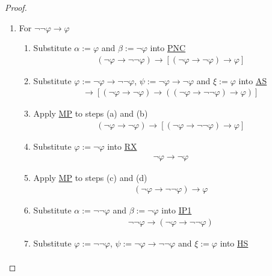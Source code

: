 \documentclass{treatise}
\begin{document}
\begin{proof} \ 
\begin{enumerate}
    \item For $\neg \neg \varphi \to \varphi$
    \begin{enumerate}
        \item Substitute $\alpha := \varphi$ and $\beta := \neg \varphi$ into \hyperref[HPL-A-PNC]{PNC}
        \begin{align*}
            (\neg \varphi \to \neg \neg \varphi) \to [(\neg \varphi \to \neg \varphi) \to \varphi]
        \end{align*}
        \item Substitute $\varphi := \neg \varphi \to \neg \neg \varphi$, $\psi := \neg \varphi \to \neg \varphi$ and $\xi := \varphi$ into \hyperref[HPL-T-AS]{AS}
        \begin{align*}
            [(\neg \varphi \to \neg \neg \varphi) \to ((\neg \varphi \to \neg \varphi) \to \varphi)] \to [(\neg \varphi \to \neg \varphi) \to ((\neg \varphi \to \neg \neg \varphi) \to \varphi)]
        \end{align*}
        \item Apply \hyperref[HPL-R-MP]{MP} to steps (a) and (b)
        \begin{align*}
            (\neg \varphi \to \neg \varphi) \to [(\neg \varphi \to \neg \neg \varphi) \to \varphi]
        \end{align*}
        \item Substitute $\varphi := \neg \varphi$ into \hyperref[HPL-T-RX]{RX}
        \begin{align*}
            \neg \varphi \to \neg \varphi
        \end{align*}
        \item Apply \hyperref[HPL-R-MP]{MP} to steps (c) and (d)
        \begin{align*}
            (\neg \varphi \to \neg \neg \varphi) \to \varphi
        \end{align*}
        \item Substitute $\alpha := \neg \neg \varphi$ and $\beta := \neg \varphi$ into \hyperref[HPL-A-IP1]{IP1}
        \begin{align*}
            \neg \neg \varphi \to (\neg \varphi \to \neg \neg \varphi)
        \end{align*}
        \item Substitute $\varphi := \neg \neg \varphi$, $\psi := \neg \varphi \to \neg \neg \varphi$ and $\xi := \varphi$ into \hyperref[HPL-T-HS]{HS}
        \begin{align*}

\end{align*}
\end{enumerate}
\end{enumerate}
\end{proof}
\end{document}
